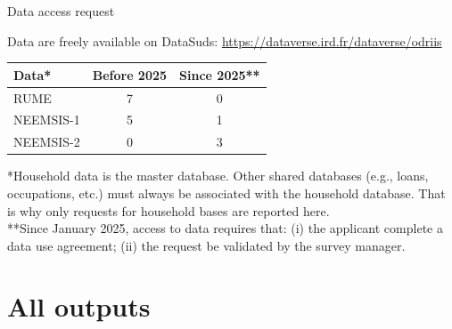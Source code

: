 \documentclass[aspectratio=169]{beamer}
\begin{document}
\begin{frame}{Data access request}
\begin{small}

Data are freely available on DataSuds: \href{https://dataverse.ird.fr/dataverse/odriis}{https://dataverse.ird.fr/dataverse/odriis}

\begin{table}[]
\begin{tabular}{lcc}
\toprule
Data*     & Before 2025 & Since 2025** \\
\midrule
RUME      & 7             & 0          \\
NEEMSIS-1 & 5             & 1          \\
NEEMSIS-2 & 0             & 3          \\
\bottomrule
\end{tabular}
\end{table}

\begin{scriptsize}
\begin{brickbox}
*Household data is the master database. Other shared databases (e.g., loans, occupations, etc.) must always be associated with the household database. That is why only requests for household bases are reported here. \\
**Since January 2025, access to data requires that: (i) the applicant complete a data use agreement; (ii) the request be validated by the survey manager.
\end{brickbox}
\end{scriptsize}

\end{small}
\end{frame}







\section*{All outputs}
\begin{frame}
\label{all}


\end{frame}
\end{document}
